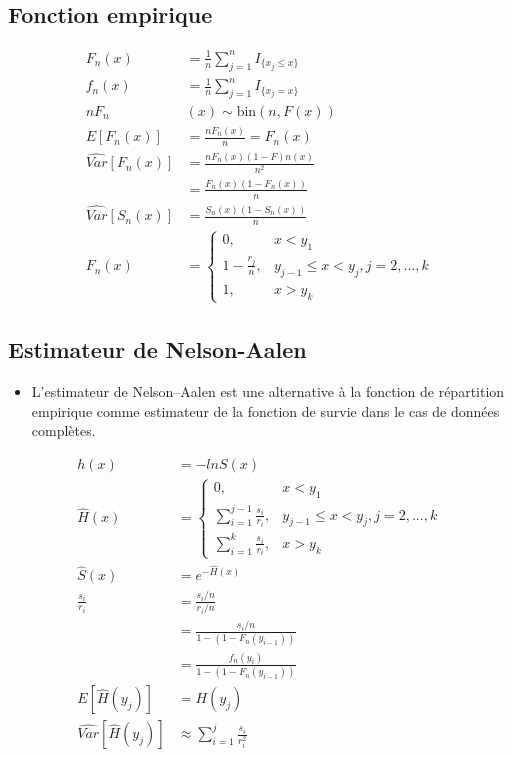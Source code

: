 \documentclass[french, landscape]{article}
\begin{document}
\begin{multicols*}{3}
\subsection*{Fonction empirique}
\begin{align*}
F_n(x) &= \frac{1}{n} \sum\limits_{j=1}^n I_{\{ x_j \leq x\}} \\
f_n(x) &= \frac{1}{n} \sum\limits_{j=1}^n I_{\{ x_j = x\}}  \\
 n F_n&(x)  \sim \text{bin}(n, F(x))\\
E[F_n(x)] &= \frac{n F_n(x)}{n} = F_n(x)\\
\widehat{Var}[F_n(x)] &= \frac{n F_n(x)(1 - F)n(x)}{n^2} \\
       &= \frac{F_n(x)(1 - F_n(x))}{n}  \\
\widehat{Var}[S_n(x)] &= \frac{S_n(x)(1 - S_n(x))}{n} \\
F_n(x) &= 
\left\{
	\begin{array}{ll}
		0,  &  x < y_1 \\
        1 - \frac{r_j}{n}, &  y_{j-1} \leq x < y_j, j=2,...,k \\
        1, & x > y_k 
	\end{array}
\right.
\end{align*}

\subsection*{Estimateur de Nelson-Aalen}
\begin{itemize}
    \item L'estimateur de Nelson–Aalen est une alternative à la fonction de répartition empirique comme estimateur de la fonction de survie dans le cas de données complètes.
\end{itemize}
\begin{align*}
    h(x) &= -ln S(x) \\
    \hat{H}(x) &= 
    \left\{
	\begin{array}{ll}
		0,  &  x < y_1 \\
        \sum\limits_{i=1}^{j-1} \frac{s_i}{r_i}, &  y_{j-1} \leq x < y_j, j=2,...,k \\
        \sum\limits_{i=1}^{k} \frac{s_i}{r_i}, & x > y_k 
	\end{array}
\right. \\
\hat{S}(x) &= e^{-\hat{H}(x)} \\
\frac{s_i}{r_i} &= \frac{s_i/n}{r_i/n} \\
                &= \frac{s_i/n}{1 - (1 - F_n(y_{i-1}))} \\
                &= \frac{f_n(y_i)}{1 - (1 - F_n(y_{i-1}))} \\
E[\hat{H}(y_j)] &= H(y_j) \\
\widehat{Var}[\hat{H}(y_j)] &\approx \sum_{i=1}^j \frac{s_i}{r_i^2} 
\end{align*}


\end{multicols*}
\end{document}
